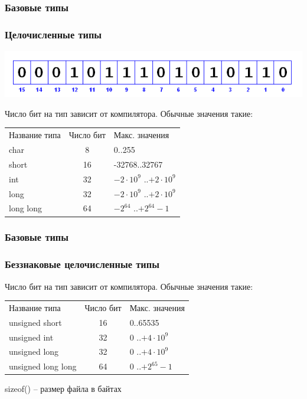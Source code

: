 \documentclass[14pt,pdf,hyperref={unicode}]{beamer}
\begin{document}
\begin{frame}
\frametitle{Базовые типы}
\frametitle{Целочисленные типы} 
\begin{center}
\includegraphics[scale=0.5]{bit_positions.png}
\end{center}
Число бит на тип зависит от компилятора. Обычные значения такие:
\begin{center}
\begin{tabular}{ l c l }
  Название типа & Число бит & Макс. значения \\
  char & 8 & 0..255 \\
  short & 16 & -32768..32767 \\
  int & 32 & $-2 \cdot 10^9$ ..$+2 \cdot 10^9$ \\
  long & 32& $-2 \cdot 10^9$ ..$+2 \cdot 10^9$ \\
  long long & 64 & $-2^{64}$ ..$+2^{64}-1$ \\
\end{tabular}
\end{center}
\end{frame}

\begin{frame}
\frametitle{Базовые типы}
\frametitle{Беззнаковые целочисленные типы} 
Число бит на тип зависит от компилятора. Обычные значения такие:
\begin{center}
\begin{tabular}{ l c l }
  Название типа & Число бит & Макс. значения \\
  unsigned short & 16 & 0..65535 \\
  unsigned int & 32 & $0$ ..$+4 \cdot 10^9$ \\
  unsigned long & 32& $0$ ..$+4 \cdot 10^9$ \\
  unsigned long long & 64 & $0$ ..$+2^{65}-1$ \\
\end{tabular}
\end{center}
sizeof() -- размер файла в байтах
\end{frame}
\end{document}

